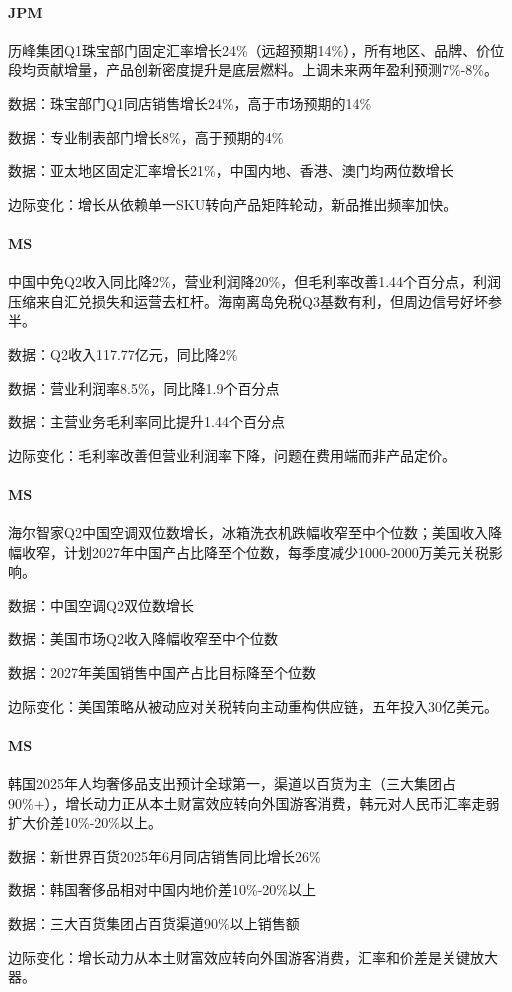 \documentclass[11pt]{ctexart}
\begin{document}
\paragraph{JPM} 历峰集团Q1珠宝部门固定汇率增长24\%（远超预期14\%），所有地区、品牌、价位段均贡献增量，产品创新密度提升是底层燃料。上调未来两年盈利预测7\%-8\%。
{\small\color{refgray}数据：珠宝部门Q1同店销售增长24\%，高于市场预期的14\%\par}
{\small\color{refgray}数据：专业制表部门增长8\%，高于预期的4\%\par}
{\small\color{refgray}数据：亚太地区固定汇率增长21\%，中国内地、香港、澳门均两位数增长\par}
{\small\color{refgray}边际变化：增长从依赖单一SKU转向产品矩阵轮动，新品推出频率加快。\par}
\paragraph{MS} 中国中免Q2收入同比降2\%，营业利润降20\%，但毛利率改善1.44个百分点，利润压缩来自汇兑损失和运营去杠杆。海南离岛免税Q3基数有利，但周边信号好坏参半。
{\small\color{refgray}数据：Q2收入117.77亿元，同比降2\%\par}
{\small\color{refgray}数据：营业利润率8.5\%，同比降1.9个百分点\par}
{\small\color{refgray}数据：主营业务毛利率同比提升1.44个百分点\par}
{\small\color{refgray}边际变化：毛利率改善但营业利润率下降，问题在费用端而非产品定价。\par}
\paragraph{MS} 海尔智家Q2中国空调双位数增长，冰箱洗衣机跌幅收窄至中个位数；美国收入降幅收窄，计划2027年中国产占比降至个位数，每季度减少1000-2000万美元关税影响。
{\small\color{refgray}数据：中国空调Q2双位数增长\par}
{\small\color{refgray}数据：美国市场Q2收入降幅收窄至中个位数\par}
{\small\color{refgray}数据：2027年美国销售中国产占比目标降至个位数\par}
{\small\color{refgray}边际变化：美国策略从被动应对关税转向主动重构供应链，五年投入30亿美元。\par}
\paragraph{MS} 韩国2025年人均奢侈品支出预计全球第一，渠道以百货为主（三大集团占90\%+），增长动力正从本土财富效应转向外国游客消费，韩元对人民币汇率走弱扩大价差10\%-20\%以上。
{\small\color{refgray}数据：新世界百货2025年6月同店销售同比增长26\%\par}
{\small\color{refgray}数据：韩国奢侈品相对中国内地价差10\%-20\%以上\par}
{\small\color{refgray}数据：三大百货集团占百货渠道90\%以上销售额\par}
{\small\color{refgray}边际变化：增长动力从本土财富效应转向外国游客消费，汇率和价差是关键放大器。\par}
\end{document}
